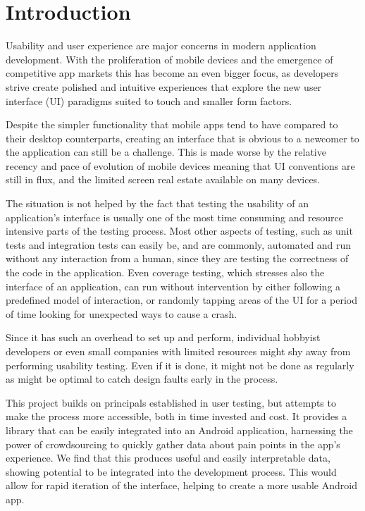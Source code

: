 \chapter{Introduction}

Usability and user experience are major concerns in modern application
development. With the proliferation of mobile devices and the emergence of competitive
app markets this has become an even bigger focus, as developers strive
create polished and intuitive experiences that explore the new user
interface (UI) paradigms suited to touch and smaller form factors.

Despite the simpler functionality that mobile apps tend to have compared to
their desktop counterparts, creating an interface that is obvious to a newcomer
to the application can still be a challenge. This is made worse by the relative
recency and pace of evolution of mobile devices meaning that UI conventions are
still in flux, and the limited screen real estate available on many devices.

The situation is not helped by the fact that testing the usability of an
application's interface is usually one of the most time consuming and resource
intensive parts of the testing process. Most other aspects of testing, such as
unit tests and integration tests can easily be, and are commonly, automated and
run without any interaction from a human, since they are testing the
correctness of the code in the application. Even coverage testing, which
stresses also the interface of an application, can run without intervention by
either following a predefined model of interaction, or randomly tapping areas
of the UI for a period of time looking for unexpected ways to cause a crash.

Since it has such an overhead to set up and perform, individual hobbyist
developers or even small companies with limited resources might shy away from
performing usability testing. Even if it is done, it might not be done as
regularly as might be optimal to catch design faults early in the process.

This project builds on principals established in user testing, but attempts
to make the process more accessible, both in time invested and cost. It 
provides a library that can be easily integrated into an Android application,
harnessing the power of crowdsourcing to quickly gather data about pain
points in the app's experience. We find that this produces useful and
easily interpretable data, showing potential to be integrated into the development
process. This would allow for rapid iteration of the interface, helping to
create a more usable Android app.

